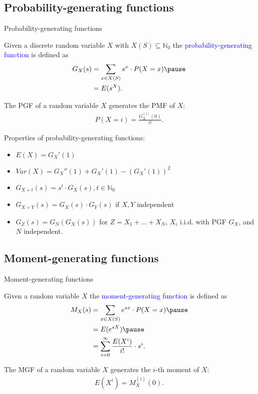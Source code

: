 \documentclass{beamer}
\def\padding{\vspace{0.5cm}}
\def\b{\textcolor{blue}}
\begin{document}
\subsection{Probability-generating functions}
\begin{frame}{Probability-generating functions}
    \begin{definition}
       Given a discrete random variable $X$ with $X(S) \subseteq \mathbb{N}_0$ the \b{probability-generating function} is defined as
        \begin{align*}
            G_X(s) &= \sum_{x \in X(S)} s^x \cdot P(X=x)\pause \\
                   &= E(s^X).
        \end{align*}
    \end{definition}\pause\par\padding
    The PGF of a random variable $X$ generates the PMF of $X$:
    \begin{align*}
        P(X = i) = \frac{G_X^{(i)}(0)}{i!}.
    \end{align*}
\end{frame}

\begin{frame}
    Properties of probability-generating functions:\pause
    \begin{itemize}
        \item $E(X) = G_X'(1)$\pause
        \item $Var(X) = G_X''(1) + G_X'(1) - (G_X'(1))^2$\pause
        \item $G_{X + t}(s) = s^t \cdot G_X(s), t \in \mathbb{N}_0$\pause
        \item $G_{X + Y}(s) = G_X(s) \cdot G_Y(s)$ if $X,Y$ independent\pause
        \item $G_Z(s) = G_N(G_X(s))$ for $Z = X_1 + \dots + X_N$, $X_i$ i.i.d. with PGF $G_X$, and $N$ independent.
    \end{itemize}
\end{frame}

\subsection{Moment-generating functions}
\begin{frame}{Moment-generating functions}
    \begin{definition}
       Given a random variable $X$ the \b{moment-generating function} is defined as
        \begin{align*}
            M_X(s) &= \sum_{x \in X(S)} e^{s x} \cdot P(X=x)\pause \\
                   &= E(e^{s X})\pause \\
                   &= \sum_{i=0}^{\infty} \frac{E(X^i)}{i!} \cdot s^i.
        \end{align*}
    \end{definition}\pause\par\padding
    The MGF of a random variable $X$ generates the $i$-th moment of $X$:
    \begin{align*}
        E(X^i) = M_X^{(i)}(0).
    \end{align*}
\end{frame}
\end{document}
